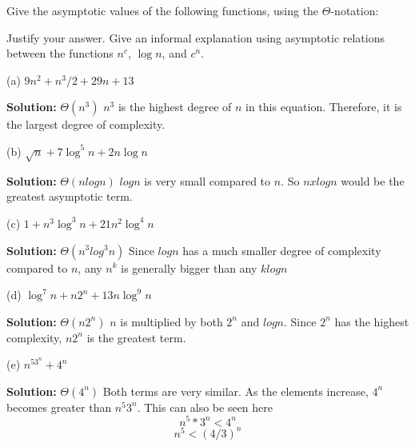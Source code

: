 
\begin{problem}
Give the asymptotic values of the
following functions, using the $\Theta$-notation:

Justify your answer.
Give an informal explanation using asymptotic
relations between the functions $n^c$, $\log n$, and $c^n$.

(a) $9n^2 + n^3/2 + 29n + 13$

\newline
\textbf{Solution:} $\Theta (n^3)$
\newline\newline
$n^3$ is the highest degree of $n$ in this equation. Therefore, it is the largest degree of complexity.

(b) $\sqrt{n}+ 7\log^5 n + 2n\log n$

\newline
\textbf{Solution:} $\Theta (nlogn)$
\newline\newline
$logn$ is very small compared to $n$. So $n x logn$ would be the greatest asymptotic term.

(c) $1+ n^3\log^3n + 21 n^2\log^4n$

\newline
\textbf{Solution:} $\Theta (n^3log^3n)$
\newline\newline
Since $logn$ has a much smaller degree of complexity compared to $n$, any $n^k$ is generally bigger than any $klogn$

(d) $\log^7n + n 2^n + 13n\log^9n$

\newline
\textbf{Solution:} $\Theta (n2^n)$
\newline\newline
$n$ is multiplied by both $2^n$ and $logn$. Since $2^n$ has the highest complexity, $n2^n$ is the greatest term.

(e) {$n^53^n+4^n$}

\newline
\textbf{Solution:} $\Theta (4^n)$
\newline\newline
Both terms are very similar. As the elements increase, $4^n$ becomes greater than $n^5 3^n$. This can also be seen here
\[ n^5 * 3^n  <  4^n \]
\[ n^5 < (4/3)^n \]

\end{problem}



